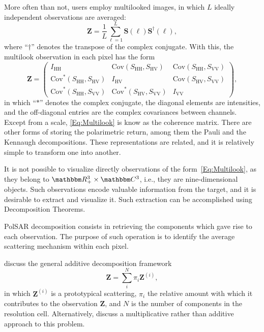\documentclass{article}
\begin{document}
More often than not, users employ multilooked images, in which $L$ ideally independent observations are averaged:
\begin{equation}
\bm Z = \frac{1}{L} \sum_{\ell=1}^L \bm S(\ell) \bm S^\dag(\ell),
\end{equation}
where ``$\dag$'' denotes the transpose of the complex conjugate.
With this, the multilook observation in each pixel has the form
\begin{equation}
\bm Z = \begin{pmatrix}
I_{\text{HH}} & \text{Cov}(S_{\text{HH}},S_\text{HV}) & \text{Cov}(S_{\text{HH}},S_\text{VV}) \\
\text{Cov}^*(S_{\text{HH}},S_\text{HV}) & I_{\text{HV}} & \text{Cov}(S_{\text{HV}},S_\text{VV})\\
\text{Cov}^*(S_{\text{HH}},S_\text{VV}) & \text{Cov}^*(S_{\text{HV}},S_\text{VV}) & I_{\text{VV}}
\end{pmatrix},
\label{Eq:Multilook}
\end{equation}
in which ``$*$'' denotes the complex conjugate, the diagonal elements are intensities, and the off-diagonal entries are the complex covariances between channels.
Except from a scale, \eqref{Eq:Multilook} is know as the coherence matrix.
There are other forms of storing the polarimetric return, among them the Pauli and the Kennaugh decompositions.
These representations are related, and it is relatively simple to transform one into another.

It is not possible to visualize directly observations of the form~\eqref{Eq:Multilook}, as they belong to $\mathbbm R_+^3\times \mathbbm C^3$, i.e., they are nine-dimensional objects.
Such observations encode valuable information from the target, and it is desirable to extract and visualize it.
Such extraction can be accomplished using Decomposition Theorems.


PolSAR decomposition consists in retrieving the components which gave rise to each observation.
The purpose of such operation is to identify the average scattering mechanism within each pixel.

\citet{ModelingandInterpretationofScatteringMechanismsinPolarimetricSyntheticApertureRadarAdvancesandPerspectives2014} discuss the general additive decomposition framework
\begin{equation}
\bm Z = \sum_i^N \pi_i \bm Z^{(i)},
\end{equation}
in which $\bm Z^{(i)}$ is a prototypical scattering, 
$\pi_i$ the relative amount with which it contributes to the observation $\bm Z$, and $N$ is the number of components in the resolution cell.
Alternatively, \citet{APolSARScatteringPowerFactorizationFrameworkandNovelRollInvariantParametersBasedUnsupervisedClassificationSchemeUsingaGeodesicDistanceinpress} discuss a multiplicative rather than additive approach to this problem.
\end{document}
